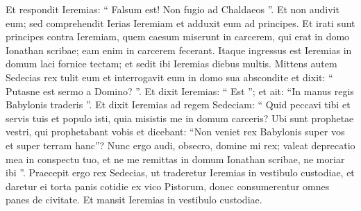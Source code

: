\begin{biblechapter}
\begin{biblechapter}
\begin{biblechapter}
\begin{biblechapter}
\begin{biblechapter}
\begin{biblechapter}
\begin{biblechapter}
\begin{biblechapter}
\begin{biblechapter}
\begin{biblechapter}
\begin{biblechapter}
\begin{biblechapter}
\begin{biblechapter}
\begin{biblechapter}
\begin{biblechapter}
\begin{biblechapter}
\begin{biblechapter}
\begin{biblechapter}
\begin{biblechapter}
\begin{biblechapter}
\begin{biblechapter}
\begin{biblechapter}
\begin{biblechapter}
\begin{biblechapter}
\begin{biblechapter}
\begin{biblechapter}
\begin{biblechapter}
\begin{biblechapter}
\begin{biblechapter}
\begin{biblechapter}
\begin{biblechapter}
\begin{biblechapter}
\begin{biblechapter}
\begin{biblechapter}
\begin{biblechapter}
\begin{biblechapter}
\begin{biblechapter}
 \verse Et respondit Ieremias: “ Falsum est! Non fugio ad Chaldaeos ”. Et non audivit eum; sed comprehendit Ierias Ieremiam et adduxit eum ad principes. 
\verse Et irati sunt principes contra Ieremiam, quem caesum miserunt in carcerem, qui erat in domo Ionathan scribae; eam enim in carcerem fecerant. 
\verse Itaque ingressus est Ieremias in domum laci fornice tectam; et sedit ibi Ieremias diebus multis. 
 \verse Mittens autem Sedecias rex tulit eum et interrogavit eum in domo sua abscondite et dixit: “ Putasne est sermo a Domino? ”. Et dixit Ieremias: “ Est ”; et ait: “In manus regis Babylonis traderis ”. 
\verse Et dixit Ieremias ad regem Sedeciam: “ Quid peccavi tibi et servis tuis et populo isti, quia misistis me in domum carceris? 
\verse Ubi sunt prophetae vestri, qui prophetabant vobis et dicebant: “Non veniet rex Babylonis super vos et super terram hanc”? 
\verse Nunc ergo audi, obsecro, domine mi rex; valeat deprecatio mea in conspectu tuo, et ne me remittas in domum Ionathan scribae, ne moriar ibi ”.
 \verse Praecepit ergo rex Sedecias, ut traderetur Ieremias in vestibulo custodiae, et daretur ei torta panis cotidie ex vico Pistorum, donec consumerentur omnes panes de civitate. Et mansit Ieremias in vestibulo custodiae.
 

\end{biblechapter}
\end{biblechapter}
\end{biblechapter}
\end{biblechapter}
\end{biblechapter}
\end{biblechapter}
\end{biblechapter}
\end{biblechapter}
\end{biblechapter}
\end{biblechapter}
\end{biblechapter}
\end{biblechapter}
\end{biblechapter}
\end{biblechapter}
\end{biblechapter}
\end{biblechapter}
\end{biblechapter}
\end{biblechapter}
\end{biblechapter}
\end{biblechapter}
\end{biblechapter}
\end{biblechapter}
\end{biblechapter}
\end{biblechapter}
\end{biblechapter}
\end{biblechapter}
\end{biblechapter}
\end{biblechapter}
\end{biblechapter}
\end{biblechapter}
\end{biblechapter}
\end{biblechapter}
\end{biblechapter}
\end{biblechapter}
\end{biblechapter}
\end{biblechapter}
\end{biblechapter}
